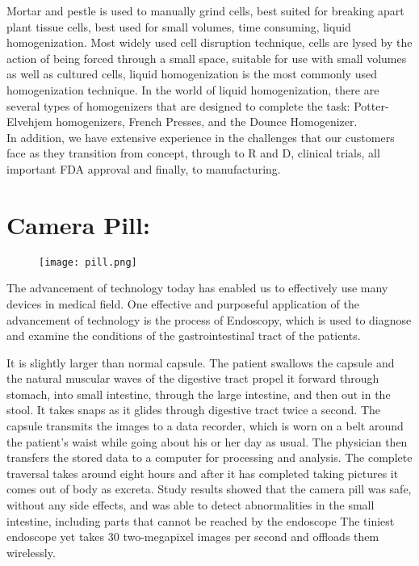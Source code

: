 \documentclass[a4paper,12pt]{article}
\begin{document}
Mortar and pestle is used to manually grind cells, best suited for 
breaking apart plant tissue cells, best used for small volumes, time 
consuming, liquid homogenization.
Most widely used cell disruption technique, cells are lysed by the action 
of being forced through a small space, suitable for use with small volumes 
as well as cultured cells, liquid homogenization is the most commonly used 
homogenization technique. In the world of liquid homogenization, there are 
several types of homogenizers that are designed to complete the task: 
Potter-Elvehjem homogenizers, French Presses, and the Dounce Homogenizer.
\\

In addition, we have extensive experience in the challenges that our 
customers face as they transition from concept, through to R and D, 
clinical trials, all important FDA approval and finally, to manufacturing. 
\clearpage

\section{Camera Pill:}
\begin{figure}[h]
	\texttt{[image: pill.png]}
\end{figure}

The advancement of technology today has enabled us to effectively use many devices in medical field. One effective and purposeful application of the advancement of technology is the process of Endoscopy, which is used to diagnose and examine the conditions of the gastrointestinal tract of the
patients. 


It is slightly larger than normal capsule. The patient swallows the capsule and the natural muscular waves of
the digestive tract propel it forward through stomach, into small intestine, through the large intestine, and then
out in the stool. It takes snaps as it glides through digestive tract twice a second. The capsule transmits the
images to a data recorder, which is worn on a belt around the patient's waist while going about his or her day
as usual. The physician then transfers the stored data to a computer for processing and analysis. The complete
traversal takes around eight hours and after it has completed taking pictures it comes out of body as excreta.
Study results showed that the camera pill was safe, without any side effects, and was able to detect
abnormalities in the small intestine, including parts that cannot be reached by the endoscope The tiniest
endoscope yet takes 30 two-megapixel images per second and offloads them wirelessly.
\end{document}
